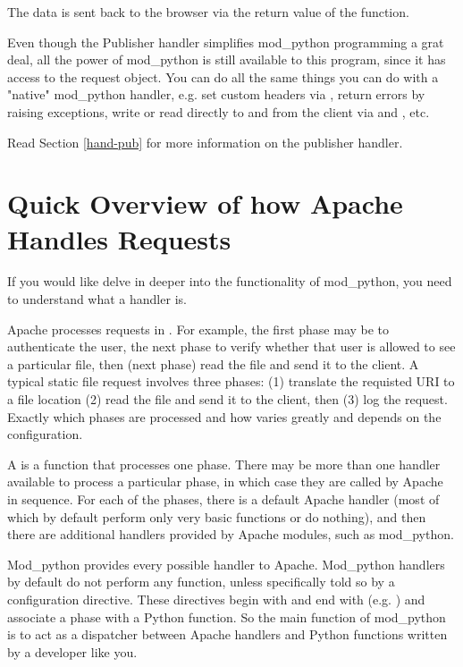The data is sent back to the browser via the return value of the
function.

Even though the Publisher handler simplifies mod_python programming a
grat deal, all the power of mod_python is still available to this
program, since it has access to the request object. You can do all the
same things you can do with a "native" mod_python handler, e.g. set
custom headers via , return errors by raising
 exceptions, write or read directly to
and from the client via  and ,
etc.

Read Section \ref{hand-pub} 
for more information on the publisher handler. 

\section{Quick Overview of how Apache Handles Requests\label{tut-overview}}

If you would like delve in deeper into the functionality of
mod_python, you need to understand what a handler is.  

Apache processes requests in . For example, the first
phase may be to authenticate the user, the next phase to verify
whether that user is allowed to see a particular file, then (next
phase) read the file and send it to the client. A typical static file
request involves three phases: (1) translate the requisted URI to a
file location (2) read the file and send it to the client, then (3)
log the request. Exactly which phases are processed and how varies
greatly and depends on the configuration.

A  is a function that processes one phase. There may be
more than one handler available to process a particular phase, in
which case they are called by Apache in sequence. For each of the
phases, there is a default Apache handler (most of which by default
perform only very basic functions or do nothing), and then there are
additional handlers provided by Apache modules, such as mod_python.

Mod_python provides every possible handler to Apache. Mod_python
handlers by default do not perform any function, unless specifically
told so by a configuration directive. These directives begin with
 and end with 
(e.g. ) and associate a phase with a Python
function. So the main function of mod_python is to act as a dispatcher
between Apache handlers and Python functions written by a developer
like you.

